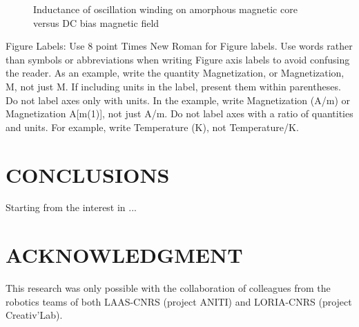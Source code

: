\documentclass[letterpaper, 10 pt, conference]{ieeeconf}  %
\begin{document}
	
	\begin{figure}[thpb]
		\centering
		\caption{Inductance of oscillation winding on amorphous
			magnetic core versus DC bias magnetic field}
		\label{figurelabel}
	\end{figure}
	
	
	Figure Labels: Use 8 point Times New Roman for Figure labels. Use words rather than symbols or abbreviations when writing Figure axis labels to avoid confusing the reader. As an example, write the quantity Magnetization, or Magnetization, M, not just M. If including units in the label, present them within parentheses. Do not label axes only with units. In the example, write Magnetization (A/m) or Magnetization {A[m(1)]}, not just A/m. Do not label axes with a ratio of quantities and units. For example, write Temperature (K), not Temperature/K.
	
	\section{CONCLUSIONS}
	
	Starting from the interest in ... 
	
	\addtolength{\textheight}{-12cm}   %
	
	
	
	
	
	
	
	
	
	\section*{ACKNOWLEDGMENT}
	
	This research was only possible with the collaboration of colleagues from the robotics teams of both LAAS-CNRS (project ANITI) and LORIA-CNRS (project Creativ’Lab).
	
	
	
	
	
	
		
	
	
	
\end{document}
